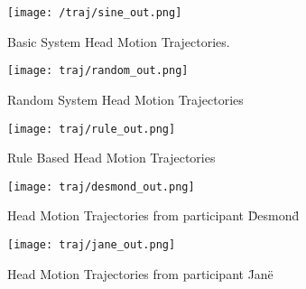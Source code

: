 
\begin{figure}
	\caption{Basic System Head Motion Trajectories.}
	\texttt{[image: /traj/sine\_out.png]}
\end{figure}

\begin{figure}
	\caption{Random System Head Motion Trajectories}
	\texttt{[image: traj/random\_out.png]}
\end{figure}

\begin{figure}
	\caption{Rule Based Head Motion Trajectories}
	\texttt{[image: traj/rule\_out.png]}
\end{figure}

\begin{figure}
	\caption{Head Motion Trajectories from participant \"Desmond\"}
	\texttt{[image: traj/desmond\_out.png]}
\end{figure}

\begin{figure}
	\caption{Head Motion Trajectories from participant \"Jane\"}
	\texttt{[image: traj/jane\_out.png]}
\end{figure}

